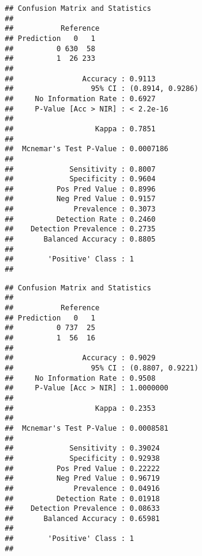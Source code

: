 \documentclass[
]{article}
\newenvironment{Shaded}{\begin{snugshade}}{\end{snugshade}}
\newcommand{\AttributeTok}[1]{\textcolor[rgb]{0.13,0.29,0.53}{#1}}
\newcommand{\DocumentationTok}[1]{\textcolor[rgb]{0.56,0.35,0.01}{\textbf{\textit{#1}}}}
\newcommand{\FunctionTok}[1]{\textcolor[rgb]{0.13,0.29,0.53}{\textbf{#1}}}
\newcommand{\NormalTok}[1]{#1}
\newcommand{\OtherTok}[1]{\textcolor[rgb]{0.56,0.35,0.01}{#1}}
\newcommand{\SpecialCharTok}[1]{\textcolor[rgb]{0.81,0.36,0.00}{\textbf{#1}}}
\newcommand{\StringTok}[1]{\textcolor[rgb]{0.31,0.60,0.02}{#1}}
\begin{document}
\begin{verbatim}
## Confusion Matrix and Statistics
## 
##           Reference
## Prediction   0   1
##          0 630  58
##          1  26 233
##                                           
##                Accuracy : 0.9113          
##                  95% CI : (0.8914, 0.9286)
##     No Information Rate : 0.6927          
##     P-Value [Acc > NIR] : < 2.2e-16       
##                                           
##                   Kappa : 0.7851          
##                                           
##  Mcnemar's Test P-Value : 0.0007186       
##                                           
##             Sensitivity : 0.8007          
##             Specificity : 0.9604          
##          Pos Pred Value : 0.8996          
##          Neg Pred Value : 0.9157          
##              Prevalence : 0.3073          
##          Detection Rate : 0.2460          
##    Detection Prevalence : 0.2735          
##       Balanced Accuracy : 0.8805          
##                                           
##        'Positive' Class : 1               
## 
\end{verbatim}

\begin{Shaded}
\end{Shaded}

\begin{verbatim}
## Confusion Matrix and Statistics
## 
##           Reference
## Prediction   0   1
##          0 737  25
##          1  56  16
##                                           
##                Accuracy : 0.9029          
##                  95% CI : (0.8807, 0.9221)
##     No Information Rate : 0.9508          
##     P-Value [Acc > NIR] : 1.0000000       
##                                           
##                   Kappa : 0.2353          
##                                           
##  Mcnemar's Test P-Value : 0.0008581       
##                                           
##             Sensitivity : 0.39024         
##             Specificity : 0.92938         
##          Pos Pred Value : 0.22222         
##          Neg Pred Value : 0.96719         
##              Prevalence : 0.04916         
##          Detection Rate : 0.01918         
##    Detection Prevalence : 0.08633         
##       Balanced Accuracy : 0.65981         
##                                           
##        'Positive' Class : 1               
## 
\end{verbatim}
\end{document}
